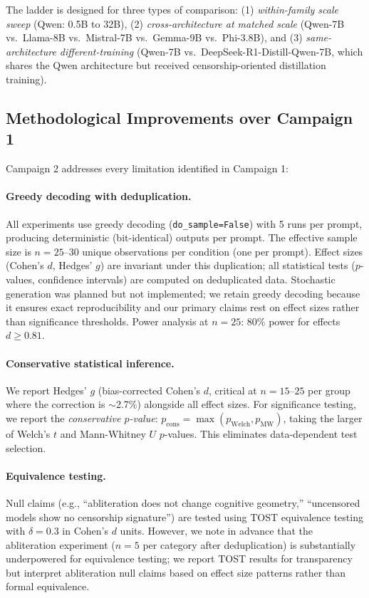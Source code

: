 \documentclass[11pt,a4paper]{article}
\begin{document}
The ladder is designed for three types of comparison: (1) \emph{within-family scale sweep} (Qwen: 0.5B to 32B), (2) \emph{cross-architecture at matched scale} (Qwen-7B vs.\ Llama-8B vs.\ Mistral-7B vs.\ Gemma-9B vs.\ Phi-3.8B), and (3) \emph{same-architecture different-training} (Qwen-7B vs.\ DeepSeek-R1-Distill-Qwen-7B, which shares the Qwen architecture but received censorship-oriented distillation training).

\subsection{Methodological Improvements over Campaign 1}
\label{sec:methods_improvements}

Campaign 2 addresses every limitation identified in Campaign 1:

\paragraph{Greedy decoding with deduplication.} All experiments use greedy decoding (\texttt{do\_sample=False}) with 5 runs per prompt, producing deterministic (bit-identical) outputs per prompt. The effective sample size is $n = 25\text{--}30$ unique observations per condition (one per prompt). Effect sizes (Cohen's $d$, Hedges' $g$) are invariant under this duplication; all statistical tests ($p$-values, confidence intervals) are computed on deduplicated data. Stochastic generation was planned but not implemented; we retain greedy decoding because it ensures exact reproducibility and our primary claims rest on effect sizes rather than significance thresholds. Power analysis at $n = 25$: 80\% power for effects $d \geq 0.81$.

\paragraph{Conservative statistical inference.} We report Hedges' $g$ \citep{hedges1981distribution} (bias-corrected Cohen's $d$, critical at $n = 15$--$25$ per group where the correction is $\sim$2.7\%) alongside all effect sizes. For significance testing, we report the \emph{conservative $p$-value}: $p_{\text{cons}} = \max(p_{\text{Welch}}, p_{\text{MW}})$, taking the larger of Welch's $t$ and Mann-Whitney $U$ $p$-values. This eliminates data-dependent test selection.

\paragraph{Equivalence testing.} Null claims (e.g., ``abliteration does not change cognitive geometry,'' ``uncensored models show no censorship signature'') are tested using TOST equivalence testing \citep{schuirmann1987comparison} with $\delta = 0.3$ in Cohen's $d$ units. However, we note in advance that the abliteration experiment ($n = 5$ per category after deduplication) is substantially underpowered for equivalence testing; we report TOST results for transparency but interpret abliteration null claims based on effect size patterns rather than formal equivalence.
\end{document}
